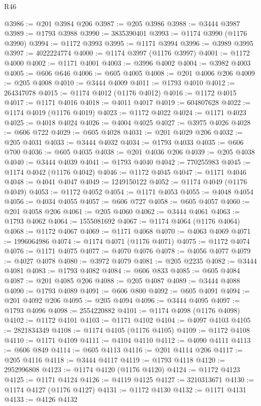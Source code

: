 \begin{lexlean}{R46}
\begin{coremodule}
@3986 := @201 @3984 @206
@3987 := @205 @3986
@3988 := @3444 @3987
@3989 := @1793 @3988
@3990 := 3835390401
@3993 := @1174 @3990 (@1176 @3990)
@3994 := @1172 @3993
@3995 := @1171 @3994
@3996 := @3989 @3995
@3997 := 4022224774
@4000 := @1174 @3997 (@1176 @3997)
@4001 := @1172 @4000
@4002 := @1171 @4001
@4003 := @3996 @4002
@4004 := @3982 @4003
@4005 := @606 @646
@4006 := @605 @4005
@4008 := @201 @4006 @206
@4009 := @205 @4008
@4010 := @3444 @4009
@4011 := @1793 @4010
@4012 := 264347078
@4015 := @1174 @4012 (@1176 @4012)
@4016 := @1172 @4015
@4017 := @1171 @4016
@4018 := @4011 @4017
@4019 := 604807628
@4022 := @1174 @4019 (@1176 @4019)
@4023 := @1172 @4022
@4024 := @1171 @4023
@4025 := @4018 @4024
@4026 := @4004 @4025
@4027 := @3975 @4026
@4028 := @606 @722
@4029 := @605 @4028
@4031 := @201 @4029 @206
@4032 := @205 @4031
@4033 := @3444 @4032
@4034 := @1793 @4033
@4035 := @606 @700
@4036 := @605 @4035
@4038 := @201 @4036 @206
@4039 := @205 @4038
@4040 := @3444 @4039
@4041 := @1793 @4040
@4042 := 770255983
@4045 := @1174 @4042 (@1176 @4042)
@4046 := @1172 @4045
@4047 := @1171 @4046
@4048 := @4041 @4047
@4049 := 1249150122
@4052 := @1174 @4049 (@1176 @4049)
@4053 := @1172 @4052
@4054 := @1171 @4053
@4055 := @4048 @4054
@4056 := @4034 @4055
@4057 := @606 @727
@4058 := @605 @4057
@4060 := @201 @4058 @206
@4061 := @205 @4060
@4062 := @3444 @4061
@4063 := @1793 @4062
@4064 := 1555081692
@4067 := @1174 @4064 (@1176 @4064)
@4068 := @1172 @4067
@4069 := @1171 @4068
@4070 := @4063 @4069
@4071 := 1996064986
@4074 := @1174 @4071 (@1176 @4071)
@4075 := @1172 @4074
@4076 := @1171 @4075
@4077 := @4070 @4076
@4078 := @4056 @4077
@4079 := @4027 @4078
@4080 := @3972 @4079
@4081 := @205 @2235
@4082 := @3444 @4081
@4083 := @1793 @4082
@4084 := @606 @833
@4085 := @605 @4084
@4087 := @201 @4085 @206
@4088 := @205 @4087
@4089 := @3444 @4088
@4090 := @1793 @4089
@4091 := @606 @800
@4092 := @605 @4091
@4094 := @201 @4092 @206
@4095 := @205 @4094
@4096 := @3444 @4095
@4097 := @1793 @4096
@4098 := 2554220882
@4101 := @1174 @4098 (@1176 @4098)
@4102 := @1172 @4101
@4103 := @1171 @4102
@4104 := @4097 @4103
@4105 := 2821834349
@4108 := @1174 @4105 (@1176 @4105)
@4109 := @1172 @4108
@4110 := @1171 @4109
@4111 := @4104 @4110
@4112 := @4090 @4111
@4113 := @606 @849
@4114 := @605 @4113
@4116 := @201 @4114 @206
@4117 := @205 @4116
@4118 := @3444 @4117
@4119 := @1793 @4118
@4120 := 2952996808
@4123 := @1174 @4120 (@1176 @4120)
@4124 := @1172 @4123
@4125 := @1171 @4124
@4126 := @4119 @4125
@4127 := 3210313671
@4130 := @1174 @4127 (@1176 @4127)
@4131 := @1172 @4130
@4132 := @1171 @4131
@4133 := @4126 @4132

\end{coremodule}
\end{lexlean}
